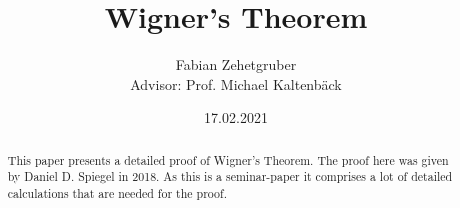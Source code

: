 \documentclass{article}
\title
{
  Wigner's Theorem
}
\author
{
  Fabian Zehetgruber \\ [1cm]{\small Advisor: Prof. Michael Kaltenbäck}
}
\date{17.02.2021}
\begin{document}
	
\maketitle

\begin{abstract}
	This paper presents a detailed proof of Wigner's Theorem. The proof here was given by Daniel D. Spiegel in 2018. As this is a seminar-paper it comprises a lot of detailed calculations that are needed for the proof.
\end{abstract}















\printbibliography
\end{document}
